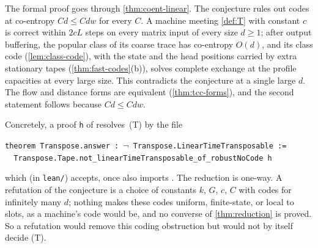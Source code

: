 \begin{outline}
The formal proof goes through \cref{thm:coent-linear}. The conjecture rules out codes at co-entropy
$Cd\le Cdw$ for every $C$. A machine meeting \cref{def:T} with constant $c$ is correct within $2cL$ steps on every matrix input of every size $d\ge1$; after output buffering, the popular class of its coarse trace has co-entropy $O(d)$, and its
class code (\cref{lem:class-code}), with the state and the head positions carried by extra stationary
tapes (\cref{thm:fast-codes}(b)), solves complete exchange at the profile capacities at every large
size. This contradicts the conjecture at a single large $d$. The flow and distance forms are
equivalent (\cref{thm:tcc-forms}), and the second statement follows because $Cd\le Cdw$.
\end{outline}

Concretely, a proof \texttt{h} of  resolves~(T) by the file
\begin{center}
\texttt{theorem Transpose.answer : $\neg$ Transpose.LinearTimeTransposable :=}\\
\texttt{\ \ Transpose.Tape.not\_linearTimeTransposable\_of\_robustNoCode h}
\end{center}
which  (in \texttt{lean/}) accepts, once  also imports
. The reduction is one-way. A refutation of the conjecture is a
choice of constants $k$, $G$, $c$, $C$ with codes for infinitely many $d$; nothing makes these codes uniform,
finite-state, or local to slots, as a machine's code would be, and no converse of \cref{thm:reduction} is
proved. So a refutation would remove this coding obstruction but would not by itself decide (T).

